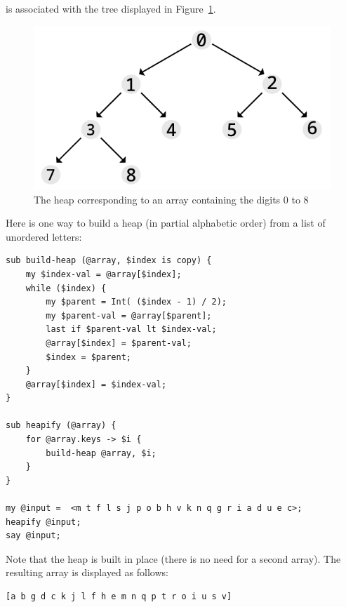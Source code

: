 is associated with the tree displayed in Figure~\ref{fig.heap}.

\begin{figure}
\centerline
{\includegraphics[scale=1]{figs/figure_heap.pdf}}
\caption{The heap corresponding to an array containing the digits 0 to 8}
\label{fig.heap}
\end{figure}

Here is one way to build a heap (in partial alphabetic order) 
from a list of unordered letters:

\begin{verbatim}
sub build-heap (@array, $index is copy) {
    my $index-val = @array[$index];
    while ($index) {
        my $parent = Int( ($index - 1) / 2);
        my $parent-val = @array[$parent];
        last if $parent-val lt $index-val;
        @array[$index] = $parent-val;
        $index = $parent;
    }
    @array[$index] = $index-val;
}

sub heapify (@array) {
    for @array.keys -> $i {
        build-heap @array, $i;
    }
}

my @input =  <m t f l s j p o b h v k n q g r i a d u e c>; 
heapify @input;
say @input;
\end{verbatim}

Note that the heap is built in place (there is no 
need for a second array). The resulting array is 
displayed as follows:
\begin{verbatim}
[a b g d c k j l f h e m n q p t r o i u s v]
\end{verbatim}

